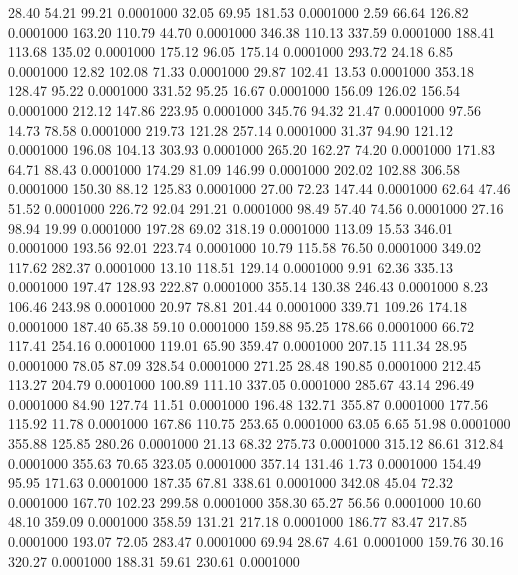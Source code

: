  28.40   54.21   99.21   0.0001000
  32.05   69.95  181.53   0.0001000
   2.59   66.64  126.82   0.0001000
 163.20  110.79   44.70   0.0001000
 346.38  110.13  337.59   0.0001000
 188.41  113.68  135.02   0.0001000
 175.12   96.05  175.14   0.0001000
 293.72   24.18    6.85   0.0001000
  12.82  102.08   71.33   0.0001000
  29.87  102.41   13.53   0.0001000
 353.18  128.47   95.22   0.0001000
 331.52   95.25   16.67   0.0001000
 156.09  126.02  156.54   0.0001000
 212.12  147.86  223.95   0.0001000
 345.76   94.32   21.47   0.0001000
  97.56   14.73   78.58   0.0001000
 219.73  121.28  257.14   0.0001000
  31.37   94.90  121.12   0.0001000
 196.08  104.13  303.93   0.0001000
 265.20  162.27   74.20   0.0001000
 171.83   64.71   88.43   0.0001000
 174.29   81.09  146.99   0.0001000
 202.02  102.88  306.58   0.0001000
 150.30   88.12  125.83   0.0001000
  27.00   72.23  147.44   0.0001000
  62.64   47.46   51.52   0.0001000
 226.72   92.04  291.21   0.0001000
  98.49   57.40   74.56   0.0001000
  27.16   98.94   19.99   0.0001000
 197.28   69.02  318.19   0.0001000
 113.09   15.53  346.01   0.0001000
 193.56   92.01  223.74   0.0001000
  10.79  115.58   76.50   0.0001000
 349.02  117.62  282.37   0.0001000
  13.10  118.51  129.14   0.0001000
   9.91   62.36  335.13   0.0001000
 197.47  128.93  222.87   0.0001000
 355.14  130.38  246.43   0.0001000
   8.23  106.46  243.98   0.0001000
  20.97   78.81  201.44   0.0001000
 339.71  109.26  174.18   0.0001000
 187.40   65.38   59.10   0.0001000
 159.88   95.25  178.66   0.0001000
  66.72  117.41  254.16   0.0001000
 119.01   65.90  359.47   0.0001000
 207.15  111.34   28.95   0.0001000
  78.05   87.09  328.54   0.0001000
 271.25   28.48  190.85   0.0001000
 212.45  113.27  204.79   0.0001000
 100.89  111.10  337.05   0.0001000
 285.67   43.14  296.49   0.0001000
  84.90  127.74   11.51   0.0001000
 196.48  132.71  355.87   0.0001000
 177.56  115.92   11.78   0.0001000
 167.86  110.75  253.65   0.0001000
  63.05    6.65   51.98   0.0001000
 355.88  125.85  280.26   0.0001000
  21.13   68.32  275.73   0.0001000
 315.12   86.61  312.84   0.0001000
 355.63   70.65  323.05   0.0001000
 357.14  131.46    1.73   0.0001000
 154.49   95.95  171.63   0.0001000
 187.35   67.81  338.61   0.0001000
 342.08   45.04   72.32   0.0001000
 167.70  102.23  299.58   0.0001000
 358.30   65.27   56.56   0.0001000
  10.60   48.10  359.09   0.0001000
 358.59  131.21  217.18   0.0001000
 186.77   83.47  217.85   0.0001000
 193.07   72.05  283.47   0.0001000
  69.94   28.67    4.61   0.0001000
 159.76   30.16  320.27   0.0001000
 188.31   59.61  230.61   0.0001000
